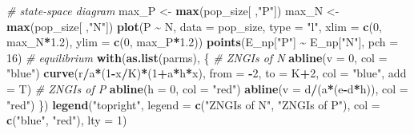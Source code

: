 \documentclass[
]{book}
\newenvironment{Shaded}{\begin{snugshade}}{\end{snugshade}}
\newcommand{\AttributeTok}[1]{\textcolor[rgb]{0.13,0.29,0.53}{#1}}
\newcommand{\CommentTok}[1]{\textcolor[rgb]{0.56,0.35,0.01}{\textit{#1}}}
\newcommand{\DecValTok}[1]{\textcolor[rgb]{0.00,0.00,0.81}{#1}}
\newcommand{\FloatTok}[1]{\textcolor[rgb]{0.00,0.00,0.81}{#1}}
\newcommand{\FunctionTok}[1]{\textcolor[rgb]{0.13,0.29,0.53}{\textbf{#1}}}
\newcommand{\NormalTok}[1]{#1}
\newcommand{\OtherTok}[1]{\textcolor[rgb]{0.56,0.35,0.01}{#1}}
\newcommand{\SpecialCharTok}[1]{\textcolor[rgb]{0.81,0.36,0.00}{\textbf{#1}}}
\newcommand{\StringTok}[1]{\textcolor[rgb]{0.31,0.60,0.02}{#1}}
\begin{document}
\begin{Shaded}
\begin{Highlighting}[]
\CommentTok{\# state{-}space diagram}
\NormalTok{max\_P }\OtherTok{\textless{}{-}} \FunctionTok{max}\NormalTok{(pop\_size[ ,}\StringTok{"P"}\NormalTok{])}
\NormalTok{max\_N }\OtherTok{\textless{}{-}} \FunctionTok{max}\NormalTok{(pop\_size[ ,}\StringTok{"N"}\NormalTok{])}
\FunctionTok{plot}\NormalTok{(P }\SpecialCharTok{\textasciitilde{}}\NormalTok{ N, }\AttributeTok{data =}\NormalTok{ pop\_size, }\AttributeTok{type =} \StringTok{"l"}\NormalTok{, }\AttributeTok{xlim =} \FunctionTok{c}\NormalTok{(}\DecValTok{0}\NormalTok{, max\_N}\SpecialCharTok{*}\FloatTok{1.2}\NormalTok{), }\AttributeTok{ylim =} \FunctionTok{c}\NormalTok{(}\DecValTok{0}\NormalTok{, max\_P}\SpecialCharTok{*}\FloatTok{1.2}\NormalTok{))}
\FunctionTok{points}\NormalTok{(E\_np[}\StringTok{"P"}\NormalTok{] }\SpecialCharTok{\textasciitilde{}}\NormalTok{ E\_np[}\StringTok{"N"}\NormalTok{], }\AttributeTok{pch =} \DecValTok{16}\NormalTok{) }\CommentTok{\# equilibrium }
\FunctionTok{with}\NormalTok{(}\FunctionTok{as.list}\NormalTok{(parms), \{}
  \CommentTok{\# ZNGIs of N}
  \FunctionTok{abline}\NormalTok{(}\AttributeTok{v =} \DecValTok{0}\NormalTok{, }\AttributeTok{col =} \StringTok{"blue"}\NormalTok{)}
  \FunctionTok{curve}\NormalTok{(r}\SpecialCharTok{/}\NormalTok{a}\SpecialCharTok{*}\NormalTok{(}\DecValTok{1}\SpecialCharTok{{-}}\NormalTok{x}\SpecialCharTok{/}\NormalTok{K)}\SpecialCharTok{*}\NormalTok{(}\DecValTok{1}\SpecialCharTok{+}\NormalTok{a}\SpecialCharTok{*}\NormalTok{h}\SpecialCharTok{*}\NormalTok{x), }\AttributeTok{from =} \SpecialCharTok{{-}}\DecValTok{2}\NormalTok{, }\AttributeTok{to =}\NormalTok{ K}\SpecialCharTok{+}\DecValTok{2}\NormalTok{, }\AttributeTok{col =} \StringTok{"blue"}\NormalTok{, }\AttributeTok{add =}\NormalTok{ T)}
  \CommentTok{\# ZNGIs of P}
  \FunctionTok{abline}\NormalTok{(}\AttributeTok{h =} \DecValTok{0}\NormalTok{, }\AttributeTok{col =} \StringTok{"red"}\NormalTok{)}
  \FunctionTok{abline}\NormalTok{(}\AttributeTok{v =}\NormalTok{ d}\SpecialCharTok{/}\NormalTok{(a}\SpecialCharTok{*}\NormalTok{(e}\SpecialCharTok{{-}}\NormalTok{d}\SpecialCharTok{*}\NormalTok{h)), }\AttributeTok{col =} \StringTok{"red"}\NormalTok{)}
\NormalTok{  \}) }
\FunctionTok{legend}\NormalTok{(}\StringTok{"topright"}\NormalTok{, }\AttributeTok{legend =} \FunctionTok{c}\NormalTok{(}\StringTok{"ZNGIs of N"}\NormalTok{, }\StringTok{"ZNGIs of P"}\NormalTok{), }\AttributeTok{col =} \FunctionTok{c}\NormalTok{(}\StringTok{"blue"}\NormalTok{, }\StringTok{"red"}\NormalTok{), }\AttributeTok{lty =} \DecValTok{1}\NormalTok{)}
\end{Highlighting}
\end{Shaded}
\end{document}
